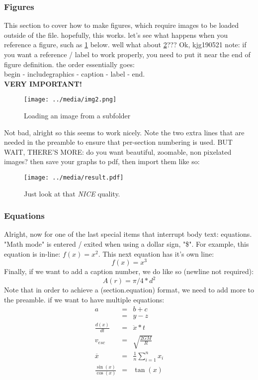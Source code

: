 \newpage
\subsubsection{Figures}
This section to cover how to make figures, which require images to be loaded outside of the file. hopefully, this works. let's see what happens when you reference a figure, such as \ref{figure-parking} below. well what about \ref{figure-improved}??? Ok, kjg190521 note: if you want a reference / label to work properly, you need to put it near the end of figure definition. the order essentially goes: \\
begin - includegraphics - caption - label - end. 
\\
\textbf{VERY IMPORTANT!}

\begin{figure}[h] %
\centering
\texttt{[image: ../media/img2.png]} %
\caption{Loading an image from a subfolder}
\label{figure-parking}
\end{figure}

Not bad, alright so this seems to work nicely. Note the two extra lines that are needed in the preamble to ensure that per-section numbering is used. BUT WAIT, THERE'S MORE: do you want beautiful, zoomable, non pixelated images? then save your graphs to pdf, then import them like so:
\begin{figure}[h]
\centering
\texttt{[image: ../media/result.pdf]}
\caption{Just look at that \textit{NICE} quality.}	
\label{figure-improved}
\end{figure}



\subsubsection{Equations}
Alright, now for one of the last special items that interrupt body text: equations. "Math mode" is entered / exited when using a dollar sign, "\$". For example, this equation is in-line: $ f(x)=x^2 $. This next equation has it's own line: $$f(x) = x^3$$ Finally, if we want to add a caption number, we do like so (newline not required):
\begin{equation}
A(r) = \pi/4*d^2
\end{equation}
Note that in order to achieve a (section.equation) format, we need to add more to the preamble. if we want to have multiple equations:
\begin{eqnarray}
a & = & b + c \\ %
& = & y - z\\
\frac{d(x)}{dt} &=& \ddot x * t \\
v_{esc} &=& \sqrt{\frac{2GM}{R}} \\
\overline x &=& \frac{1}{n}\sum_{i=1}^{n} x_i \\ %
\frac{\sin(x)}{\cos(x)} &=& \tan(x) 
\end{eqnarray} %

